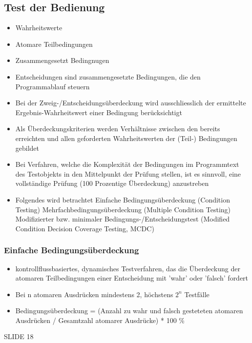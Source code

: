 \documentclass{report}
\theoremstyle{definition}
\theoremstyle{example}
\begin{document}
\subsection{Test der Bedienung}
\begin{itemize}
   \item Wahrheitswerte
   \item Atomare Teilbedingungen
   \item Zusammengesetzt Bedingnugen
   \item Entscheidungen sind zusammengesetzte Bedingungen, die den Programmablauf steuern
   \item Bei der Zweig-/Entscheidungsüberdeckung wird ausschliesslich der ermittelte Ergebnis-Wahrheitswert einer Bedingung berücksichtigt
   \item Als Überdeckungskriterien werden Verhältnisse zwischen den bereits erreichten und allen geforderten Wahrheitswerten der (Teil-) Bedingungen gebildet
   \item Bei Verfahren, welche die Komplexität der Bedingungen im Programmtext des Testobjekts in den Mittelpunkt der Prüfung stellen, ist es sinnvoll, eine vollständige Prüfung (100 Prozentige Überdeckung) anzustreben
   \item Folgendes wird betrachtet
   \subitem Einfache Bedingungsüberdeckung (Condition Testing)
   \subitem Mehrfachbedingungsüberdeckung (Multiple Condition Testing)
   \subitem Modifizierter bzw. minimaler Bedingungs-/Entscheidungstest (Modified Condition Decision Coverage Testing, MCDC)
\end{itemize}

\subsubsection{Einfache Bedingungsüberdeckung}
\begin{itemize}
   \item kontrollflussbasiertes, dynamisches Testverfahren, das die Überdeckung der atomaren Teilbedingungen einer Entscheidung mit 'wahr' oder 'falsch' fordert
   \item Bei n atomaren Ausdrücken mindestens 2, höchstens $2^n$ Testfälle
   \item Bedingungsüberdeckung = (Anzahl zu wahr und falsch gesteteten atomaren Ausdrücken / Gesamtzahl atomarer Ausdrücke) * 100 \%
\end{itemize}

SLIDE 18
\end{document}
